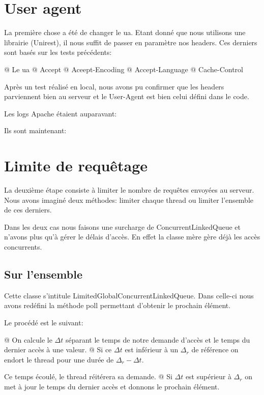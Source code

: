 \documentclass[hideweeklyreports,noposter]{polytech/polytech}
\begin{document}
		\section{User agent}
			La première chose a été de changer le \gls{ua}. Etant donné que nous utilisons une librairie (Unirest), il nous suffit de passer en paramètre nos headers.
			Ces derniers sont basés sur les tests précédents:
			\begin{easylist}[itemize]
				@ Le \gls{ua}
				@ Accept
				@ Aceept-Encoding
				@ Accept-Language
				@ Cache-Control
			\end{easylist}

			Après un test réalisé en local, nous avons pu confirmer que les headers parviennent bien au serveur et le User-Agent est bien celui défini dans le code.
			
			Les logs Apache étaient auparavant:
			
			Ils sont maintenant:
			 
		\section{Limite de requêtage}
			La deuxième étape consiste à limiter le nombre de requêtes envoyées au serveur.
			Nous avons imaginé deux méthodes: limiter chaque thread ou limiter l'ensemble de ces derniers.
			
			Dans les deux cas nous faisons une surcharge de ConcurrentLinkedQueue et n'avons plus qu'à gérer le délais d'accès.
			En effet la classe mère gère déjà les accès concurrents.
			
			\subsection{Sur l'ensemble}
				Cette classe s'intitule  LimitedGlobalConcurrentLinkedQueue.
				Dans celle-ci nous avons redéfini la méthode poll permettant d'obtenir le prochain élément.
				
				Le procédé est le suivant:
				\begin{easylist}[itemize]
					@ On calcule le $\Delta t$ séparant le temps de notre demande d'accès et le temps du dernier accès à une valeur.
					@ Si ce $\Delta t$ est inférieur à un $\Delta_r$ de référence on endort le thread pour une durée de $\Delta_r - \Delta t$.
					
					Ce temps écoulé, le thread réitérera sa demande.
					@ Si $\Delta t$ est supérieur à $\Delta_r$ on met à jour le temps du dernier accès et donnons le prochain élément.
				\end{easylist}
\end{document}
